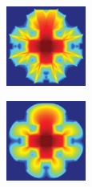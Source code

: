 \begin{figure}[h]
\centering
\begin{subfigure}{0.4\columnwidth}
\includegraphics[width=\columnwidth]{03_foundations_of_light_transport_simulation/figures/sn_ray_effects.png}
\end{subfigure}%
\hspace{0.01\columnwidth}
\begin{subfigure}{0.4\columnwidth}
\includegraphics[width=\columnwidth]{03_foundations_of_light_transport_simulation/figures/sn_ground_truth.png}

\end{subfigure}
\end{figure}
